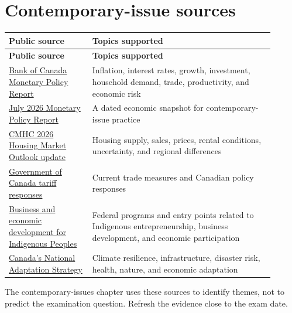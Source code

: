 \documentclass[11pt,letterpaper,oneside,openany]{book}
\begin{document}
\section[Contemporary-issue sources]{Contemporary-issue sources}
\begin{center}
\small
\setlength{\LTpre}{0.4em}
\setlength{\LTpost}{0.8em}
\begin{longtable}{>{\RaggedRight\arraybackslash}p{0.290\linewidth}>{\RaggedRight\arraybackslash}p{0.610\linewidth}}
\rowcolor{DeepNavy}
\color{white}\bfseries Public source & \color{white}\bfseries Topics supported \\
\endfirsthead
\rowcolor{DeepNavy}
\color{white}\bfseries Public source & \color{white}\bfseries Topics supported \\
\endhead
\href{https://www.bankofcanada.ca/publications/mpr/}{Bank of Canada Monetary Policy Report} & Inflation, interest rates, growth, investment, household demand, trade, productivity, and economic risk \\
\href{https://www.bankofcanada.ca/publications/mpr/mpr-2026-07-15/}{July 2026 Monetary Policy Report} & A dated economic snapshot for contemporary-issue practice \\
\href{https://www.cmhc-schl.gc.ca/media-newsroom/news-releases/2026/economic-uncertainty-continue-weighing-housing-market-cmhc}{CMHC 2026 Housing Market Outlook update} & Housing supply, sales, prices, rental conditions, uncertainty, and regional differences \\
\href{https://www.canada.ca/en/department-finance/programs/international-trade-finance-policy/canadas-tariff-responses.html}{Government of Canada tariff responses} & Current trade measures and Canadian policy responses \\
\href{https://www.canada.ca/en/services/indigenous-peoples/business-and-economic-development-indigenous-peoples.html}{Business and economic development for Indigenous Peoples} & Federal programs and entry points related to Indigenous entrepreneurship, business development, and economic participation \\
\href{https://www.canada.ca/en/services/environment/weather/climatechange/climate-plan/national-adaptation-strategy/full-strategy.html}{Canada's National Adaptation Strategy} & Climate resilience, infrastructure, disaster risk, health, nature, and economic adaptation \\
\end{longtable}
\end{center}
The contemporary-issues chapter uses these sources to identify themes, not to predict the examination question. Refresh the evidence close to the exam date.
\end{document}
